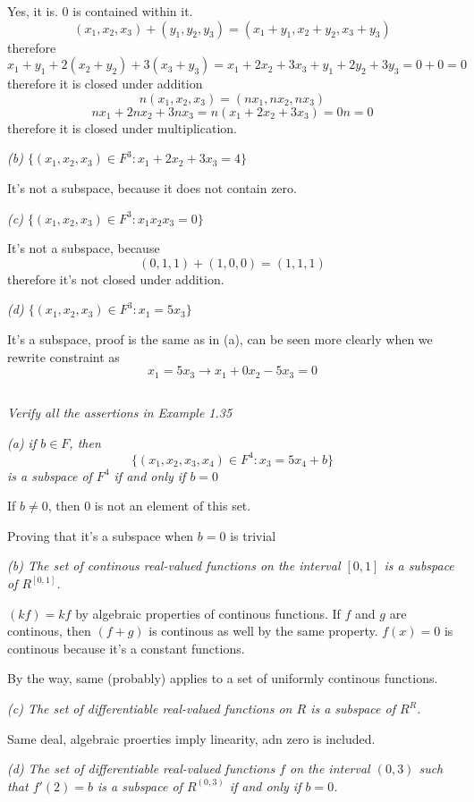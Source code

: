 \documentclass[11pt,oneside,titlepage]{book}
\begin{document}
Yes, it is. $0$ is contained within it.
$$(x_1, x_2, x_3) + (y_1, y_2, y_3) = (x_1 + y_1, x_2 + y_2, x_3 + y_3)$$
therefore
$$x_1 + y_1 + 2(x_2 + y_2) +  3(x_3 + y_3) =
x_1 + 2x_2 + 3x_3 + y_1 + 2y_2 + 3y_3 = 0+ 0 = 0$$
therefore it is closed under addition
$$n(x_1, x_2, x_3) = (nx_1, nx_2, nx_3)$$
$$nx_1 + 2nx_2 + 3nx_3 = n(x_1 + 2x_2 + 3x_3 ) = 0n = 0$$
therefore it is closed under multiplication.

\textit{(b) $\{(x_1, x_2, x_3) \in F^3: x_1 + 2x_2 + 3x_3 = 4\}$}

It's not a subspace, because it does not contain zero.


\textit{(c) $\{(x_1, x_2, x_3) \in F^3: x_1 x_2 x_3 = 0\}$}

It's not a subspace, because
$$(0, 1, 1) + (1, 0, 0) = (1, 1, 1)$$
therefore it's not closed under addition.

\textit{(d) $\{(x_1, x_2, x_3) \in F^3: x_1  = 5x_3\}$}

It's a subspace, proof is the same as in (a), can be seen more clearly when we
rewrite constraint as
$$x_1 = 5x_3 \to x_1 + 0x_2 -5x_3 = 0$$

\subsection{}
\textit{Verify all the assertions in Example 1.35}

\textit{(a) if $b \in F$, then}
$$\{(x_1, x_2, x_3, x_4) \in F^4: x_3 = 5x_4 + b\}$$
\textit{is a subspace of $F^4$ if and only if $b = 0$}

If $b \neq 0$, then $0$ is not an element of this set.

Proving that it's a subspace when $b = 0$ is trivial

\textit{(b) The set of continous real-valued functions on the interval $[0, 1]$
  is a subspace of $R^{[0, 1]}$.}

$(kf) = kf$ by algebraic properties of continous functions.
If $f$ and $g$ are continous, then $(f + g)$ is continous as well by the same
property.
$f(x) = 0$ is continous because it's a constant functions.

By the way, same (probably) applies to a set of uniformly continous functions.

\textit{(c) The set of differentiable real-valued functions on $R$ is a
  subspace of $R^R$.}

Same deal, algebraic proerties imply linearity, adn zero is included.

\textit{(d) The set of differentiable real-valued functions $f$ on the
  interval $(0, 3)$ such that $f'(2) = b$ is a subspace of $R^{(0, 3)}$
  if and only if $b = 0$.}
\end{document}
